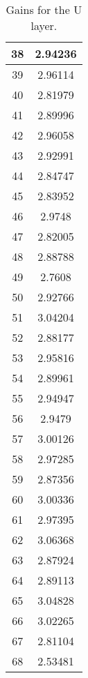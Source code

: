 \begin{table}[h]
\begin{subtable}[h]{2in}
{\begin{tabular}{|c|c|}
38	&	2.94236	\\	\hline
39	&	2.96114	\\	\hline
40	&	2.81979	\\	\hline
41	&	2.89996	\\	\hline
42	&	2.96058	\\	\hline
43	&	2.92991	\\	\hline
44	&	2.84747	\\	\hline
45	&	2.83952	\\	\hline
46	&	2.9748	\\	\hline
47	&	2.82005	\\	\hline
48	&	2.88788	\\	\hline
49	&	2.7608	\\	\hline
50	&	2.92766	\\	\hline
51	&	3.04204	\\	\hline
52	&	2.88177	\\	\hline
53	&	2.95816	\\	\hline
54	&	2.89961	\\	\hline
55	&	2.94947	\\	\hline
56	&	2.9479	\\	\hline
57	&	3.00126	\\	\hline
58	&	2.97285	\\	\hline
59	&	2.87356	\\	\hline
60	&	3.00336	\\	\hline
61	&	2.97395	\\	\hline
62	&	3.06368	\\	\hline
63	&	2.87924	\\	\hline
64	&	2.89113	\\	\hline
65	&	3.04828	\\	\hline
66	&	3.02265	\\	\hline
67	&	2.81104	\\	\hline
68	&	2.53481	\\	\hline
        \end{tabular}
        }
        \caption{Gains for the U layer.}
    \end{subtable}
    \quad
    \begin{subtable}[h]{2in}
        \centering{}
\end{subtable}
\end{table}
